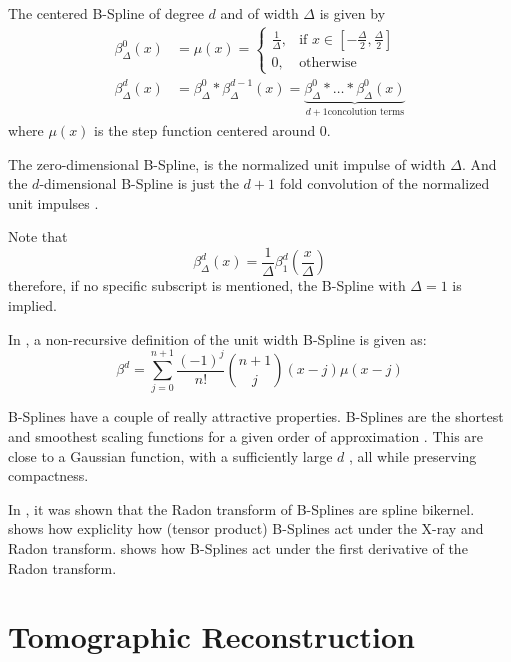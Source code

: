 \begin{definition}
	\label{def:bspline}
	The centered B-Spline of degree $d$ and of width $\Delta$ is given by
	\begin{align*}
		\beta_\Delta^0(x) & = \mu(x) =
		\begin{cases}
			\frac{1}{\Delta}, & \text{if } x \in [-\frac{\Delta}{2}, \frac{\Delta}{2}] \\
			0,                & \text{otherwise}
		\end{cases} \\
		\beta_\Delta^d(x) & = \beta_\Delta^0 * \beta_\Delta^{d-1}(x) =
		\underbrace{\beta_\Delta^0 * \dots * \beta_\Delta^0(x)}_{d+1 \text{concolution terms}}
	\end{align*}
	where $\mu(x)$ is the step function centered around 0. 

	The zero-dimensional B-Spline, is the normalized unit impulse of width $\Delta$. And the
	$d$-dimensional B-Spline is just the $d+1$ fold convolution of the normalized unit impulses
	\cite{horbelt_discretization_2002}.

	Note that
	\[ \beta_\Delta^d(x) = \frac{1}{\Delta} \beta_1^d(\frac{x}{\Delta}) \]
	therefore, if no specific subscript is mentioned, the B-Spline with $\Delta = 1$ is implied.

	In \cite{unser_fast_1991}, a non-recursive definition of the unit width B-Spline is given as:
	\[ \beta^d = \sum_{j=0}^{n+1} \frac{(-1)^j}{n!} \binom{n+1}{j}(x - j)\mu(x - j) \]
\end{definition}

B-Splines have a couple of really attractive properties. B-Splines are the shortest and smoothest
scaling functions for a given order of approximation \cite{momey_b-spline_2012}. This
are close to a Gaussian function,
with a sufficiently large $d$ \cite{momey_b-spline_2012}, all while preserving compactness.

In \cite{horbelt_discretization_2002}, it was shown that the Radon transform of B-Splines are spline
bikernel. \cite{entezari_box_2012} shows how expliclity how (tensor product) B-Splines act under
the X-ray and Radon transform. \cite{nilchian_differential_2012} shows how B-Splines act under
the first derivative of the Radon transform.

\chapter{Tomographic Reconstruction}\label{chap:tomographic_reconstruction}

